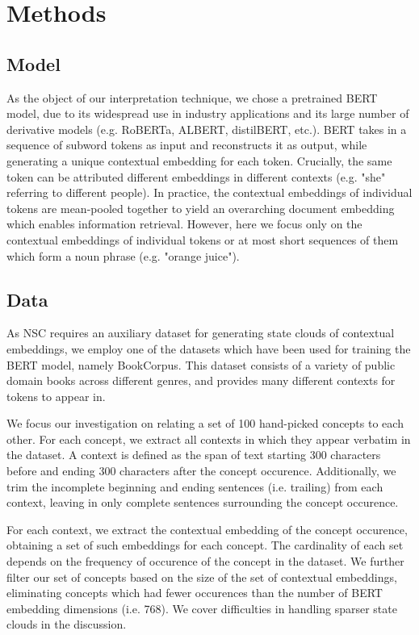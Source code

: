 \section{Methods}\label{sec:methods}

\subsection{Model}

As the object of our interpretation technique, we chose a pretrained BERT model, due to its widespread use in industry applications and its large number of derivative models (e.g. RoBERTa, ALBERT, distilBERT, etc.). BERT takes in a sequence of subword tokens as input and reconstructs it as output, while generating a unique contextual embedding for each token. Crucially, the same token can be attributed different embeddings in different contexts (e.g. "she" referring to different people). In practice, the contextual embeddings of individual tokens are mean-pooled together to yield an overarching document embedding which enables information retrieval. However, here we focus only on the contextual embeddings of individual tokens or at most short sequences of them which form a noun phrase (e.g. "orange juice").

\subsection{Data}

As NSC requires an auxiliary dataset for generating state clouds of contextual embeddings, we employ one of the datasets which have been used for training the BERT model, namely BookCorpus. This dataset consists of a variety of public domain books across different genres, and provides many different contexts for tokens to appear in.

We focus our investigation on relating a set of 100 hand-picked concepts to each other. For each concept, we extract all contexts in which they appear verbatim in the dataset. A context is defined as the span of text starting 300 characters before and ending 300 characters after the concept occurence. Additionally, we trim the incomplete beginning and ending sentences (i.e. trailing) from each context, leaving in only complete sentences surrounding the concept occurence.

For each context, we extract the contextual embedding of the concept occurence, obtaining a set of such embeddings for each concept. The cardinality of each set depends on the frequency of occurence of the concept in the dataset. We further filter our set of concepts based on the size of the set of contextual embeddings, eliminating concepts which had fewer occurences than the number of BERT embedding dimensions (i.e. 768). We cover difficulties in handling sparser state clouds in the discussion.

